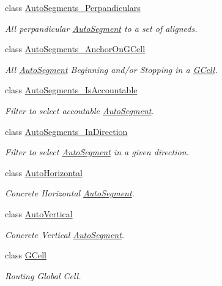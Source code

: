\begin{DoxyCompactItemize}
class \hyperlink{classKatabatic_1_1AutoSegments__Perpandiculars}{Auto\-Segments\-\_\-\-Perpandiculars}
\begin{DoxyCompactList}\small\item\em All perpandicular \hyperlink{classKatabatic_1_1AutoSegment}{Auto\-Segment} to a set of aligneds. \end{DoxyCompactList}\item 
class \hyperlink{classKatabatic_1_1AutoSegments__AnchorOnGCell}{Auto\-Segments\-\_\-\-Anchor\-On\-G\-Cell}
\begin{DoxyCompactList}\small\item\em All \hyperlink{classKatabatic_1_1AutoSegment}{Auto\-Segment} Beginning and/or Stopping in a \hyperlink{classKatabatic_1_1GCell}{G\-Cell}. \end{DoxyCompactList}\item 
class \hyperlink{classKatabatic_1_1AutoSegments__IsAccountable}{Auto\-Segments\-\_\-\-Is\-Accountable}
\begin{DoxyCompactList}\small\item\em Filter to select accoutable \hyperlink{classKatabatic_1_1AutoSegment}{Auto\-Segment}. \end{DoxyCompactList}\item 
class \hyperlink{classKatabatic_1_1AutoSegments__InDirection}{Auto\-Segments\-\_\-\-In\-Direction}
\begin{DoxyCompactList}\small\item\em Filter to select \hyperlink{classKatabatic_1_1AutoSegment}{Auto\-Segment} in a given direction. \end{DoxyCompactList}\item 
class \hyperlink{classKatabatic_1_1AutoHorizontal}{Auto\-Horizontal}
\begin{DoxyCompactList}\small\item\em Concrete Horizontal \hyperlink{classKatabatic_1_1AutoSegment}{Auto\-Segment}. \end{DoxyCompactList}\item 
class \hyperlink{classKatabatic_1_1AutoVertical}{Auto\-Vertical}
\begin{DoxyCompactList}\small\item\em Concrete Vertical \hyperlink{classKatabatic_1_1AutoSegment}{Auto\-Segment}. \end{DoxyCompactList}\item 
class \hyperlink{classKatabatic_1_1GCell}{G\-Cell}
\begin{DoxyCompactList}\small\item\em Routing Global Cell. \end{DoxyCompactList}\item 

\end{DoxyCompactItemize}

